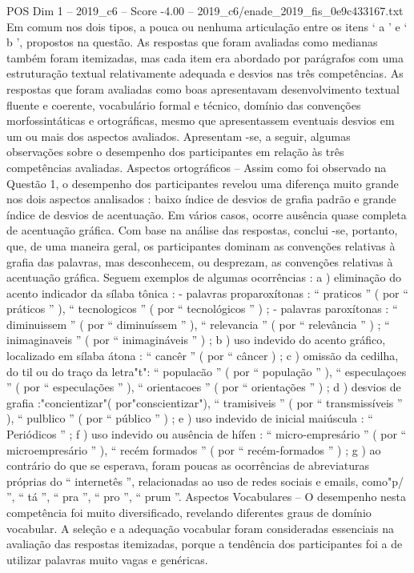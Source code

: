 \begin{textsample}{POS Dim 1 – 2019\_c6 – Score -4.00 – 2019\_c6/enade\_2019\_fis\_0e9c433167.txt}
Em comum nos dois tipos, a pouca ou nenhuma articulação entre os itens ‘ a ’ e ‘ b ’, propostos na questão.
As respostas que foram avaliadas como medianas também foram itemizadas, mas cada item era abordado por parágrafos com uma estruturação textual relativamente adequada e desvios nas três competências.
As respostas que foram avaliadas como boas apresentavam desenvolvimento textual fluente e coerente, vocabulário formal e técnico, domínio das convenções morfossintáticas e ortográficas, mesmo que apresentassem eventuais desvios em um ou mais dos aspectos avaliados.
Apresentam -se, a seguir, algumas observações sobre o desempenho dos participantes em relação às três competências avaliadas.
Aspectos ortográficos – Assim como foi observado na Questão 1, o desempenho dos participantes revelou uma diferença muito grande nos dois aspectos analisados : baixo índice de desvios de grafia padrão e grande índice de desvios de acentuação.
Em vários casos, ocorre ausência quase completa de acentuação gráfica.
Com base na análise das respostas, conclui -se, portanto, que, de uma maneira geral, os participantes dominam as convenções relativas à grafia das palavras, mas desconhecem, ou desprezam, as convenções relativas à acentuação gráfica.
Seguem exemplos de algumas ocorrências : a ) eliminação do acento indicador da sílaba tônica : - palavras proparoxítonas : “ praticos ” ( por “ práticos ” ), “ tecnologicos ” ( por “ tecnológicos ” ) ; - palavras paroxítonas : “ diminuissem ” ( por “ diminuíssem ” ), “ relevancia ” ( por “ relevância ” ) ; “ inimaginaveis ” ( por “ inimagináveis ” ) ; b ) uso indevido do acento gráfico, localizado em sílaba átona : “ cancêr ” ( por “ câncer ) ; c ) omissão da cedilha, do til ou do traço da letra"t": “ populacão ” ( por “ população ” ), “ especulaçoes ” ( por “ especulações ” ), “ orientacoes ” ( por “ orientações ” ) ; d ) desvios de grafia :"concientizar"( por"conscientizar"), “ tramisiveis ” ( por “ transmissíveis ” ), “ pulblico ” ( por “ público ” ) ; e ) uso indevido de inicial maiúscula : “ Periódicos ” ; f ) uso indevido ou ausência de hífen : “ micro-empresário ” ( por “ microempresário ” ), “ recém formados ” ( por “ recém-formados ” ) ; g ) ao contrário do que se esperava, foram poucas as ocorrências de abreviaturas próprias do “ internetês ”, relacionadas ao uso de redes sociais e emails, como"p/ ”, “ tá ”, “ pra ”, “ pro ”, “ prum ”.
Aspectos Vocabulares – O desempenho nesta competência foi muito diversificado, revelando diferentes graus de domínio vocabular.
A seleção e a adequação vocabular foram consideradas essenciais na avaliação das respostas itemizadas, porque a tendência dos participantes foi a de utilizar palavras muito vagas e genéricas.

\end{textsample}
